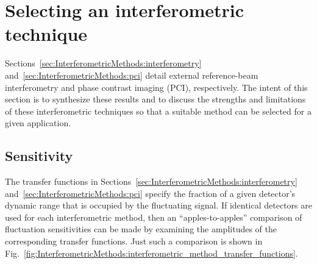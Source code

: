 \section{Selecting an interferometric technique}
\label{sec:InterferometricMethods:selection}
\graffito{\textcolor{red}{Update section: no finite sampling-volume effects}}
Sections~\ref{sec:InterferometricMethods:interferometry}
and~\ref{sec:InterferometricMethods:pci}
detail external reference-beam interferometry and
phase contrast imaging (PCI), respectively.
The intent of this section is to synthesize these results and
to discuss the strengths and limitations
of these interferometric techniques
so that a suitable method can be selected for a given application.




\subsection{Sensitivity}
The transfer functions in
Sections~\ref{sec:InterferometricMethods:interferometry}
and~\ref{sec:InterferometricMethods:pci}
specify the fraction of a given detector's dynamic range
that is occupied by the fluctuating signal.
If identical detectors are used for each interferometric method,
then an ``apples-to-apples'' comparison of fluctuation sensitivities
can be made by examining the amplitudes
of the corresponding transfer functions.
Just such a comparison is shown in
Fig.~\ref{fig:InterferometricMethods:interferometric_method_transfer_functions}.

